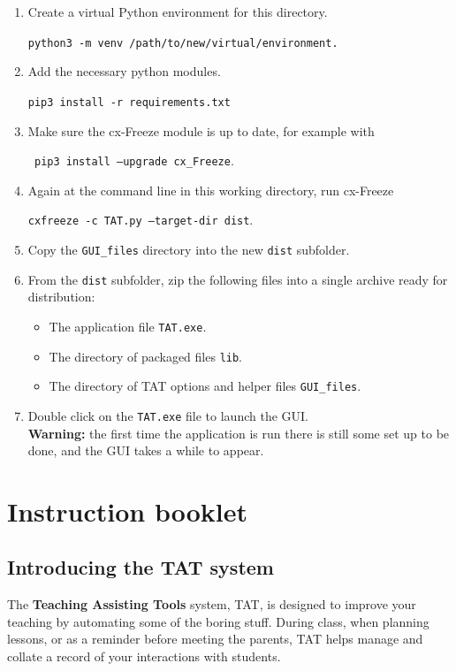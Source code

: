 \documentclass[10pt]{article}
\begin{document}
\begin{enumerate}
\item Create a virtual Python environment for this directory.

\texttt{python3 -m venv /path/to/new/virtual/environment.}


\item Add the necessary python modules.

\texttt{pip3 install -r requirements.txt}

\item Make sure the cx-Freeze module is up to date, for example with

\texttt{ pip3 install --upgrade cx\_Freeze}.

\item Again at the command line in this working directory, run cx-Freeze

\texttt{cxfreeze -c TAT.py --target-dir dist}.

\item Copy the \texttt{GUI\_files} directory into the new \texttt{dist} subfolder.
\item From the \texttt{dist} subfolder, zip the following files into a single archive ready for distribution:
\begin{itemize}
\item The application file \texttt{TAT.exe}.
\item The directory of packaged files \texttt{lib}.
\item The directory of TAT options and helper files \texttt{GUI\_files}.
\end{itemize}
\item Double click on the \texttt{TAT.exe} file to launch the GUI. \\
\textbf{Warning:} the first time the application is run there is still some set up to be done, and the GUI takes a while to appear.
\end{enumerate}

\newpage
\section{Instruction booklet} \label{instructions} 

\subsection{Introducing the TAT system}
The \textbf{Teaching Assisting Tools} system, TAT, is designed to improve your teaching by automating some of the boring stuff. During class, when planning lessons, or as a reminder before meeting the parents, TAT helps manage and collate a record of your interactions with students.
\end{document}
